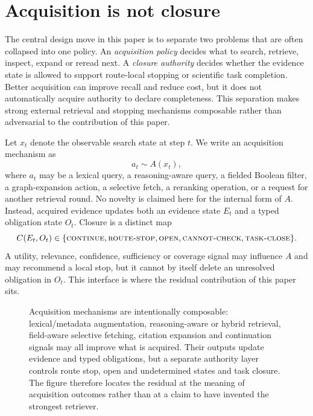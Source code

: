 \section{Acquisition is not closure}
\label{sec:acquisition-authority}

The central design move in this paper is to separate two problems that are often
collapsed into one policy.  An \emph{acquisition policy} decides what to search,
retrieve, inspect, expand or reread next.  A \emph{closure authority} decides
whether the evidence state is allowed to support route-local stopping or
scientific task completion.  Better acquisition can improve recall and reduce
cost, but it does not automatically acquire authority to declare completeness.
This separation makes strong external retrieval and stopping mechanisms
composable rather than adversarial to the contribution of this paper.

Let $x_t$ denote the observable search state at step $t$.  We write an
acquisition mechanism as
\[
  a_t \sim A(x_t),
\]
where $a_t$ may be a lexical query, a reasoning-aware query, a fielded Boolean
filter, a graph-expansion action, a selective fetch, a reranking operation, or a
request for another retrieval round.  No novelty is claimed here for the
internal form of $A$.  Instead, acquired evidence updates both an evidence state
$E_t$ and a typed obligation state $O_t$.  Closure is a distinct map
\[
  C(E_t,O_t) \in \{\textsc{continue},\textsc{route-stop},
  \textsc{open},\textsc{cannot-check},\textsc{task-close}\}.
\]
A utility, relevance, confidence, sufficiency or coverage signal may influence
$A$ and may recommend a local stop, but it cannot by itself delete an unresolved
obligation in $O_t$.  This interface is where the residual contribution of this
paper sits.

\begin{figure}[t]
\centering

\caption{Acquisition mechanisms are intentionally
composable: lexical/metadata augmentation, reasoning-aware or hybrid retrieval,
field-aware selective fetching, citation expansion and continuation signals may
all improve what is acquired.  Their outputs update evidence and typed
obligations, but a separate authority layer controls route stop, open and
undetermined states and task closure.  The figure therefore locates the residual
at the meaning of acquisition outcomes rather than at a claim to have invented
the strongest retriever.}
\label{fig:p2-7}
\end{figure}

